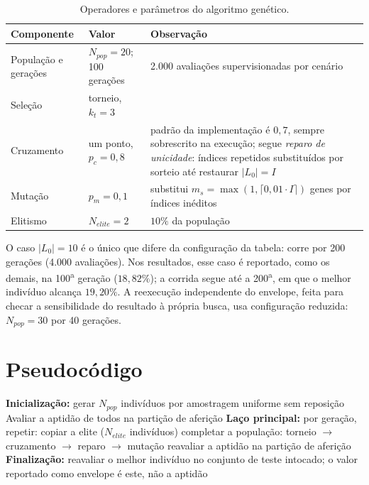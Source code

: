 \begin{table}[htb]
\centering
\caption{Operadores e parâmetros do algoritmo genético.}
\label{tab:ap-ag-params}
\small
\begin{tabular}{p{} p{} p{}}
\toprule
\textbf{Componente} & \textbf{Valor} & \textbf{Observação} \\
\midrule
População e gerações & $N_{pop}=20$; 100 gerações & 2.000 avaliações
supervisionadas por cenário \\
Seleção & torneio, $k_t=3$ & \\
Cruzamento & um ponto, $p_c=0{,}8$ & padrão da implementação é $0{,}7$,
sempre sobrescrito na execução; segue \emph{reparo de unicidade}: índices
repetidos substituídos por sorteio até restaurar $|L_0|=I$ \\
Mutação & $p_m=0{,}1$ & substitui $m_s=\max(1,\lceil 0{,}01 \cdot I\rceil)$
genes por índices inéditos \\
Elitismo & $N_{elite}=2$ & $10\%$ da população \\
\bottomrule
\end{tabular}
\end{table}

O caso $|L_0|=10$ é o único que difere da configuração da tabela: corre por
200 gerações (4.000 avaliações). Nos resultados, esse caso é reportado, como
os demais, na 100\textsuperscript{a} geração ($18{,}82\%$); a corrida segue
até a 200\textsuperscript{a}, em que o melhor indivíduo alcança
$19{,}20\%$. A reexecução independente do envelope, feita para checar a
sensibilidade do resultado à própria busca, usa configuração reduzida:
$N_{pop}=30$ por 40 gerações.

\section{Pseudocódigo}

\begin{algorithm}[H]
  \caption{Estimação do envelope de $L_0$ por algoritmo genético}
  \label{alg:ap-ag}
  \begin{algorithmic}[1]
    \State \textbf{Inicialização:} gerar $N_{pop}$ indivíduos por amostragem
    uniforme sem reposição
    \State Avaliar a aptidão de todos na partição de aferição
    \State \textbf{Laço principal:} por geração, repetir:
    \State \quad copiar a elite ($N_{elite}$ indivíduos)
    \State \quad completar a população: torneio $\to$ cruzamento $\to$
    reparo $\to$ mutação
    \State \quad reavaliar a aptidão na partição de aferição
    \State \textbf{Finalização:} reavaliar o melhor indivíduo no conjunto de
    teste intocado; o valor reportado como envelope é este, não a aptidão
  \end{algorithmic}
\end{algorithm}

